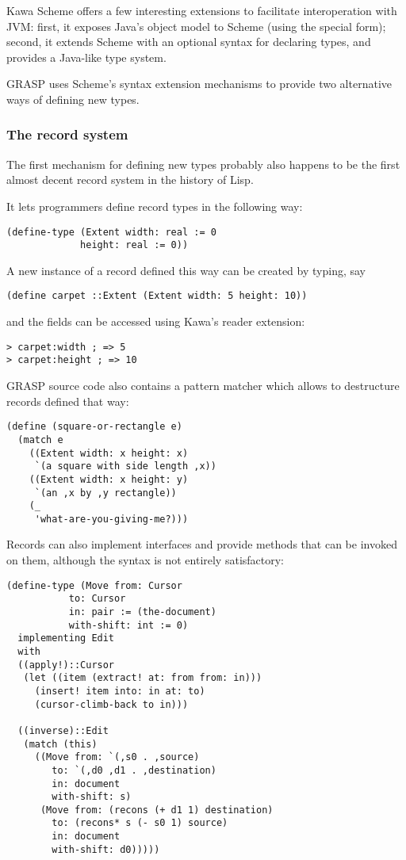 \documentclass[11pt]{article}
\begin{document}
Kawa Scheme offers a few interesting extensions
to facilitate interoperation with JVM: first,
it exposes Java's object model to Scheme
(using the special form);
second, it extends Scheme with an optional syntax
for declaring types, and provides a Java-like type
system.

GRASP uses Scheme's syntax extension mechanisms
to provide two alternative ways of defining new
types.

\subsubsection{The record system}
\label{sec:org840e993}

The first mechanism for defining new types 
probably also happens to be the first almost decent
record system in the history of Lisp.

It lets programmers define record types in the following
way:

\begin{verbatim}
(define-type (Extent width: real := 0
		     height: real := 0))
\end{verbatim}

A new instance of a record defined this way can be
created by typing, say

\begin{verbatim}
(define carpet ::Extent (Extent width: 5 height: 10))
\end{verbatim}

and the fields can be accessed using Kawa's reader
extension:

\begin{verbatim}
> carpet:width ; => 5
> carpet:height ; => 10
\end{verbatim}

GRASP source code also contains a pattern matcher
which allows to destructure records defined that way:

\begin{verbatim}
(define (square-or-rectangle e)
  (match e
    ((Extent width: x height: x)
     `(a square with side length ,x))
    ((Extent width: x height: y)
     `(an ,x by ,y rectangle))
    (_
     'what-are-you-giving-me?)))
\end{verbatim}

Records can also implement interfaces and provide methods
that can be invoked on them, although the syntax is not 
entirely satisfactory:

\begin{verbatim}
(define-type (Move from: Cursor
		   to: Cursor
		   in: pair := (the-document)
		   with-shift: int := 0)
  implementing Edit
  with
  ((apply!)::Cursor
   (let ((item (extract! at: from from: in)))
     (insert! item into: in at: to)
     (cursor-climb-back to in)))

  ((inverse)::Edit
   (match (this)
     ((Move from: `(,s0 . ,source)
	    to: `(,d0 ,d1 . ,destination)
	    in: document
	    with-shift: s)
      (Move from: (recons (+ d1 1) destination)
	    to: (recons* s (- s0 1) source)
	    in: document
	    with-shift: d0)))))
\end{verbatim}
\end{document}
